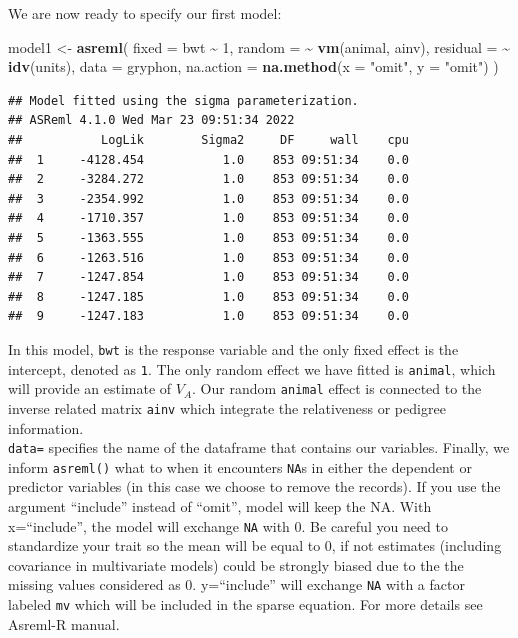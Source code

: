 \documentclass[
  12pt,
]{book}
\newenvironment{Shaded}{\begin{snugshade}}{\end{snugshade}}
\newcommand{\DataTypeTok}[1]{\textcolor[rgb]{0.13,0.29,0.53}{#1}}
\newcommand{\DecValTok}[1]{\textcolor[rgb]{0.00,0.00,0.81}{#1}}
\newcommand{\KeywordTok}[1]{\textcolor[rgb]{0.13,0.29,0.53}{\textbf{#1}}}
\newcommand{\NormalTok}[1]{#1}
\newcommand{\OperatorTok}[1]{\textcolor[rgb]{0.81,0.36,0.00}{\textbf{#1}}}
\newcommand{\StringTok}[1]{\textcolor[rgb]{0.31,0.60,0.02}{#1}}
\begin{document}
We are now ready to specify our first model:

\begin{Shaded}
\begin{Highlighting}[]
\NormalTok{model1 \textless{}{-}}\StringTok{ }\KeywordTok{asreml}\NormalTok{(}
  \DataTypeTok{fixed =}\NormalTok{ bwt }\OperatorTok{\textasciitilde{}}\StringTok{ }\DecValTok{1}\NormalTok{, }\DataTypeTok{random =} \OperatorTok{\textasciitilde{}}\StringTok{ }\KeywordTok{vm}\NormalTok{(animal, ainv),}
  \DataTypeTok{residual =} \OperatorTok{\textasciitilde{}}\StringTok{ }\KeywordTok{idv}\NormalTok{(units),}
  \DataTypeTok{data =}\NormalTok{ gryphon,}
  \DataTypeTok{na.action =} \KeywordTok{na.method}\NormalTok{(}\DataTypeTok{x =} \StringTok{"omit"}\NormalTok{, }\DataTypeTok{y =} \StringTok{"omit"}\NormalTok{)}
\NormalTok{)}
\end{Highlighting}
\end{Shaded}

\begin{verbatim}
## Model fitted using the sigma parameterization.
## ASReml 4.1.0 Wed Mar 23 09:51:34 2022
##           LogLik        Sigma2     DF     wall    cpu
##  1     -4128.454           1.0    853 09:51:34    0.0
##  2     -3284.272           1.0    853 09:51:34    0.0
##  3     -2354.992           1.0    853 09:51:34    0.0
##  4     -1710.357           1.0    853 09:51:34    0.0
##  5     -1363.555           1.0    853 09:51:34    0.0
##  6     -1263.516           1.0    853 09:51:34    0.0
##  7     -1247.854           1.0    853 09:51:34    0.0
##  8     -1247.185           1.0    853 09:51:34    0.0
##  9     -1247.183           1.0    853 09:51:34    0.0
\end{verbatim}

In this model, \texttt{bwt} is the response variable and the only fixed effect is the intercept, denoted as \texttt{1}. The only random effect we have fitted is \texttt{animal}, which will provide an estimate of \(V_A\). Our random \texttt{animal} effect is connected to the inverse related matrix \texttt{ainv} which integrate the relativeness or pedigree information.\\
\texttt{data=} specifies the name of the dataframe that contains our variables. Finally, we inform \texttt{asreml()} what to when it encounters \texttt{NA}s in either the dependent or predictor variables (in this case we choose to remove the records).
If you use the argument ``include'' instead of ``omit'', model will keep the NA. With x=``include'', the model will exchange \texttt{NA} with 0. Be careful you need to standardize your trait so the mean will be equal to 0, if not estimates (including covariance in multivariate models) could be strongly biased due to the the missing values considered as 0. y=``include'' will exchange \texttt{NA} with a factor labeled \texttt{mv} which will be included in the sparse equation. For more details see Asreml-R manual.
\end{document}
